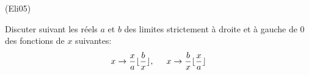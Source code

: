 \begin{tiny}(Eli05)\end{tiny} Discuter suivant les réels $a$ et $b$ des limites strictement à droite et à gauche de $0$ des fonctions de $x$ suivantes:
\begin{displaymath}
 x\rightarrow \frac{x}{a}\lfloor\frac{b}{x}\rfloor,\hspace{0.5cm}
 x\rightarrow \frac{b}{x}\lfloor\frac{x}{a} \rfloor
\end{displaymath}
